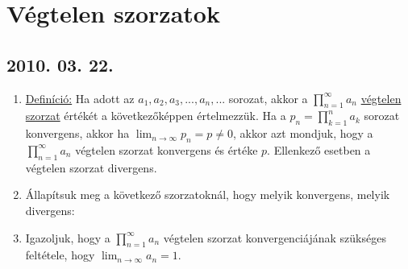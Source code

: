 \section{Végtelen szorzatok}

\subsection*{2010. 03. 22.}
\begin{enumerate}
\item \underline{Definíció:} Ha adott az $a_1, a_2, a_3,...,a_n,...$ sorozat, akkor a $\displaystyle\prod_{n=1}^{\infty} a_n$ \underline{végtelen szorzat} értékét a következőképpen értelmezzük. Ha a $p_n=\displaystyle\prod_{k=1}^{n} a_k$ sorozat konvergens, akkor ha $\displaystyle\lim_{n \to \infty}p_n=p\not=0$, akkor azt mondjuk, hogy a $\displaystyle\prod_{n=1}^{\infty} a_n$ végtelen szorzat konvergens és értéke $p$. Ellenkező esetben a végtelen szorzat divergens.
\item Állapítsuk meg a következő szorzatoknál, hogy melyik konvergens, melyik divergens:
\item Igazoljuk, hogy a $\displaystyle\prod_{n=1}^{\infty} a_n$ végtelen szorzat konvergenciájának szükséges feltétele, hogy $\displaystyle\lim_{n \to \infty}a_n=1$.

\end{enumerate}

